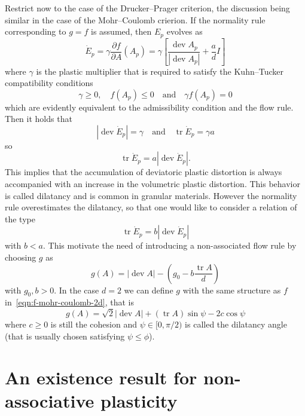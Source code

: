 \documentclass[a4paper,10pt,twoside]{amsbook}
\numberwithin{section}{chapter}
\numberwithin{equation}{chapter}
\theoremstyle{definition}
\DeclareMathOperator{\dev}{dev}
\DeclareMathOperator{\tr}{tr}
\newcommand{\dind}[2]{\frac{\partial #1}{\partial #2}}
\begin{document}
Restrict now to the case of the Drucker--Prager criterion, the discussion being similar in the case of the Mohr--Coulomb crierion. If the normality rule corresponding to $g=f$ is assumed, then $E_p$ evolves as
\[
\dot E_p=\gamma\dind{f}{A}(A_p)=\gamma\left[\frac{\dev A_p}{|\dev A_p|}+\frac{a}{d}I\right]
\]
where $\gamma$ is the plastic multiplier that is required to satisfy the Kuhn--Tucker compatibility conditions
\[
\gamma\ge0,\quad f(A_p)\le0\quad\text{and}\quad\gamma f(A_p)=0
\]
which are evidently equivalent to the admissibility condition and the flow rule. Then it holds that
\[
|\dev\dot E_p|=\gamma\quad\text{and}\quad\tr\dot E_p=\gamma a
\]
so
\[
\tr\dot E_p=a|\dev\dot E_p|.
\]
This implies that the accumulation of deviatoric plastic distortion is always accompanied with an increase in the volumetric plastic distortion. This behavior is called dilatancy and is common in granular materials. However the normality rule overestimates the dilatancy, so that one would like to consider a relation of the type
\[
\tr\dot E_p=b|\dev\dot E_p|
\]
with $b<a$. This motivate the need of introducing a non-associated flow rule by choosing $g$ as
\begin{equation}
\label{eqn:g}
g(A)=|\dev A|-\left(g_0-b\frac{\tr A}{d}\right)
\end{equation}
with $g_0,b>0$. In the case $d=2$ we can define $g$ with the same structure as $f$ in~\eqref{eqn:f-mohr-coulomb-2d}, that is
\[
g(A)=\sqrt{2}|\dev A|+(\tr A)\sin\psi-2c\cos\psi
\]
where $c\ge0$ is still the cohesion and $\psi\in[0,\pi/2)$ is called the dilatancy angle (that is usually chosen satisfying $\psi\le\phi$).

\section{An existence result for non-associative plasticity}
\end{document}
